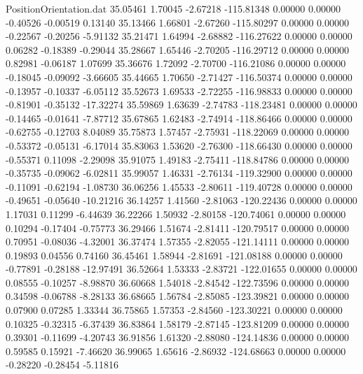 \begin{filecontents}{PositionOrientation.dat}
  35.05461    1.70045   -2.67218  -115.81348    0.00000    0.00000   -0.40526   -0.00519    0.13140
  35.13466    1.66801   -2.67260  -115.80297    0.00000    0.00000   -0.22567   -0.20256   -5.91132
  35.21471    1.64994   -2.68882  -116.27622    0.00000    0.00000    0.06282   -0.18389   -0.29044
  35.28667    1.65446   -2.70205  -116.29712    0.00000    0.00000    0.82981   -0.06187    1.07699
  35.36676    1.72092   -2.70700  -116.21086    0.00000    0.00000   -0.18045   -0.09092   -3.66605
  35.44665    1.70650   -2.71427  -116.50374    0.00000    0.00000   -0.13957   -0.10337   -6.05112
  35.52673    1.69533   -2.72255  -116.98833    0.00000    0.00000   -0.81901   -0.35132  -17.32274
  35.59869    1.63639   -2.74783  -118.23481    0.00000    0.00000   -0.14465   -0.01641   -7.87712
  35.67865    1.62483   -2.74914  -118.86466    0.00000    0.00000   -0.62755   -0.12703    8.04089
  35.75873    1.57457   -2.75931  -118.22069    0.00000    0.00000   -0.53372   -0.05131   -6.17014
  35.83063    1.53620   -2.76300  -118.66430    0.00000    0.00000   -0.55371    0.11098   -2.29098
  35.91075    1.49183   -2.75411  -118.84786    0.00000    0.00000   -0.35735   -0.09062   -6.02811
  35.99057    1.46331   -2.76134  -119.32900    0.00000    0.00000   -0.11091   -0.62194   -1.08730
  36.06256    1.45533   -2.80611  -119.40728    0.00000    0.00000   -0.49651   -0.05640  -10.21216
  36.14257    1.41560   -2.81063  -120.22436    0.00000    0.00000    1.17031    0.11299   -6.44639
  36.22266    1.50932   -2.80158  -120.74061    0.00000    0.00000    0.10294   -0.17404   -0.75773
  36.29466    1.51674   -2.81411  -120.79517    0.00000    0.00000    0.70951   -0.08036   -4.32001
  36.37474    1.57355   -2.82055  -121.14111    0.00000    0.00000    0.19893    0.04556    0.74160
  36.45461    1.58944   -2.81691  -121.08188    0.00000    0.00000   -0.77891   -0.28188  -12.97491
  36.52664    1.53333   -2.83721  -122.01655    0.00000    0.00000    0.08555   -0.10257   -8.98870
  36.60668    1.54018   -2.84542  -122.73596    0.00000    0.00000    0.34598   -0.06788   -8.28133
  36.68665    1.56784   -2.85085  -123.39821    0.00000    0.00000    0.07900    0.07285    1.33344
  36.75865    1.57353   -2.84560  -123.30221    0.00000    0.00000    0.10325   -0.32315   -6.37439
  36.83864    1.58179   -2.87145  -123.81209    0.00000    0.00000    0.39301   -0.11699   -4.20743
  36.91856    1.61320   -2.88080  -124.14836    0.00000    0.00000    0.59585    0.15921   -7.46620
  36.99065    1.65616   -2.86932  -124.68663    0.00000    0.00000   -0.28220   -0.28454   -5.11816

\end{filecontents}
